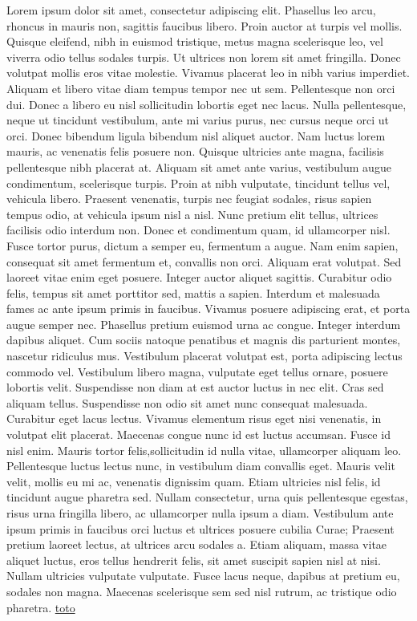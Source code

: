 \documentclass{article}
\begin{document}
\pend
\pstart
Lorem ipsum dolor sit amet, consectetur adipiscing elit. Phasellus leo arcu, rhoncus in mauris non, sagittis faucibus libero. Proin auctor at turpis vel mollis. Quisque eleifend, nibh in euismod tristique, metus magna scelerisque leo, vel viverra odio tellus sodales turpis. Ut ultrices non lorem sit amet fringilla. Donec volutpat mollis eros vitae molestie. Vivamus placerat leo in nibh varius imperdiet. Aliquam et libero vitae diam tempus tempor nec ut sem.
\pend
\pstart
\hypertarget{$&33}{}Pellentesque non orci dui. Donec a libero eu nisl sollicitudin lobortis eget nec lacus. Nulla pellentesque, neque ut tincidunt vestibulum, ante mi varius purus, nec cursus neque orci ut orci. Donec bibendum ligula bibendum nisl aliquet auctor. Nam luctus lorem mauris, ac venenatis felis posuere non. Quisque ultricies ante magna, facilisis pellentesque nibh placerat at. Aliquam sit amet ante varius, vestibulum augue condimentum, scelerisque turpis. Proin at nibh vulputate, tincidunt tellus vel, vehicula libero. Praesent venenatis, turpis nec feugiat sodales, risus sapien tempus odio, at vehicula ipsum nisl a nisl. Nunc pretium elit tellus, ultrices facilisis odio interdum non. Donec et condimentum quam, id ullamcorper nisl.
\pend
\pstart
Fusce tortor purus, dictum a semper eu, fermentum a augue. Nam enim sapien, consequat sit amet fermentum et, convallis non orci. Aliquam erat volutpat. Sed laoreet vitae enim eget posuere. Integer auctor aliquet sagittis. Curabitur odio felis, tempus sit amet porttitor sed, mattis a sapien. Interdum et malesuada fames ac ante ipsum primis in faucibus. Vivamus posuere adipiscing erat, et porta augue semper nec.
\pend
\pstart
Phasellus pretium euismod urna ac congue. Integer interdum dapibus aliquet. Cum sociis natoque penatibus et magnis dis parturient montes, nascetur ridiculus mus. Vestibulum placerat volutpat est, porta adipiscing lectus commodo vel. Vestibulum libero magna, vulputate eget tellus ornare, posuere lobortis velit. Suspendisse non diam at est auctor luctus in nec elit. Cras sed aliquam tellus. Suspendisse non odio sit amet nunc consequat malesuada. Curabitur eget lacus lectus. Vivamus elementum risus eget nisi venenatis, in volutpat elit placerat. Maecenas congue nunc id est luctus accumsan. Fusce id nisl enim.
\pend
\pstart
Mauris tortor felis,sollicitudin id nulla vitae, ullamcorper aliquam leo. Pellentesque luctus lectus nunc, in vestibulum diam convallis eget. Mauris velit velit, mollis eu mi ac, venenatis dignissim quam. Etiam ultricies nisl felis, id tincidunt augue pharetra sed. Nullam consectetur, urna quis pellentesque egestas, risus urna fringilla libero, ac ullamcorper nulla ipsum a diam. Vestibulum ante ipsum primis in faucibus orci luctus et ultrices posuere cubilia Curae; Praesent pretium laoreet lectus, at ultrices arcu sodales a. Etiam aliquam, massa vitae aliquet luctus, eros tellus hendrerit felis, sit amet suscipit sapien nisl at nisi. Nullam ultricies vulputate vulputate. Fusce lacus neque, dapibus at pretium eu, sodales non magna. Maecenas scelerisque sem sed nisl rutrum, ac tristique odio pharetra.
\pend
\endnumbering
{}
\printindex[issue115]
\hyperlink{$&33}{toto}
\end{document}

